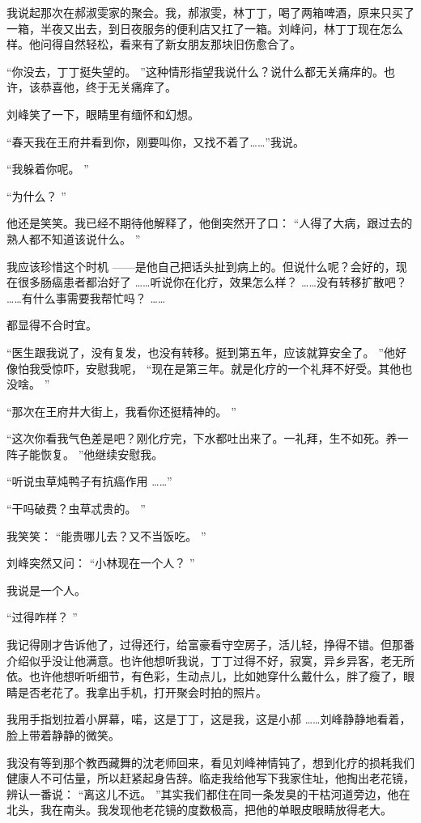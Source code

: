 \documentclass[12pt,twoside,openany]{book}
\begin{document}
我说起那次在郝淑雯家的聚会。我，郝淑雯，林丁丁，喝了两箱啤酒，原来只买了一箱，半夜又出去，到日夜服务的便利店又扛了一箱。刘峰问，林丁丁现在怎么样。他问得自然轻松，看来有了新女朋友那块旧伤愈合了。

“你没去，丁丁挺失望的。 ”这种情形指望我说什么？说什么都无关痛痒的。也许，该恭喜他，终于无关痛痒了。

刘峰笑了一下，眼睛里有缅怀和幻想。

“春天我在王府井看到你，刚要叫你，又找不着了……”我说。

“我躲着你呢。 ”

“为什么？ ”

他还是笑笑。我已经不期待他解释了，他倒突然开了口： “人得了大病，跟过去的熟人都不知道该说什么。 ”

我应该珍惜这个时机 ——是他自己把话头扯到病上的。但说什么呢？会好的，现在很多肠癌患者都治好了 ……听说你在化疗，效果怎么样？ ……没有转移扩散吧？ ……有什么事需要我帮忙吗？ ……

都显得不合时宜。

“医生跟我说了，没有复发，也没有转移。挺到第五年，应该就算安全了。 ”他好像怕我受惊吓，安慰我呢， “现在是第三年。就是化疗的一个礼拜不好受。其他也没啥。 ”

“那次在王府井大街上，我看你还挺精神的。 ”

“这次你看我气色差是吧？刚化疗完，下水都吐出来了。一礼拜，生不如死。养一阵子能恢复。 ”他继续安慰我。

“听说虫草炖鸭子有抗癌作用 ……”

“干吗破费？虫草忒贵的。 ”

我笑笑： “能贵哪儿去？又不当饭吃。 ”

刘峰突然又问： “小林现在一个人？ ”

我说是一个人。

“过得咋样？ ”

我记得刚才告诉他了，过得还行，给富豪看守空房子，活儿轻，挣得不错。但那番介绍似乎没让他满意。也许他想听我说，丁丁过得不好，寂寞，异乡异客，老无所依。也许他想听听细节，有色彩，生动点儿，比如她穿什么戴什么，胖了瘦了，眼睛是否老花了。我拿出手机，打开聚会时拍的照片。

我用手指划拉着小屏幕，喏，这是丁丁，这是我，这是小郝 ……刘峰静静地看着，脸上带着静静的微笑。

我没有等到那个教西藏舞的沈老师回来，看见刘峰神情钝了，想到化疗的损耗我们健康人不可估量，所以赶紧起身告辞。临走我给他写下我家住址，他掏出老花镜，辨认一番说： “离这儿不远。 ”其实我们都住在同一条发臭的干枯河道旁边，他在北头，我在南头。我发现他老花镜的度数极高，把他的单眼皮眼睛放得老大。
\end{document}
